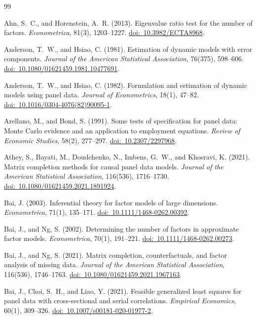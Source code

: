 \documentclass[11pt]{article}
\numberwithin{equation}{section}
\theoremstyle{remark}
\newcommand{\doilink}[1]{\href{https://doi.org/#1}{doi:\ #1}}
\begin{document}
\begin{singlespace}
\begin{thebibliography}{99}

Ahn, S.~C., and Horenstein, A.~R. (2013).
Eigenvalue ratio test for the number of factors.
\emph{Econometrica}, 81(3), 1203--1227.
\doilink{10.3982/ECTA8968}.

Anderson, T.~W., and Hsiao, C. (1981).
Estimation of dynamic models with error components.
\emph{Journal of the American Statistical Association}, 76(375), 598--606.
\doilink{10.1080/01621459.1981.10477691}.

Anderson, T.~W., and Hsiao, C. (1982).
Formulation and estimation of dynamic models using panel data.
\emph{Journal of Econometrics}, 18(1), 47--82.
\doilink{10.1016/0304-4076(82)90095-1}.

Arellano, M., and Bond, S. (1991).
Some tests of specification for panel data: Monte Carlo evidence and an application to employment equations.
\emph{Review of Economic Studies}, 58(2), 277--297.
\doilink{10.2307/2297968}.

Athey, S., Bayati, M., Doudchenko, N., Imbens, G.~W., and Khosravi, K. (2021).
Matrix completion methods for causal panel data models.
\emph{Journal of the American Statistical Association}, 116(536), 1716--1730.
\doilink{10.1080/01621459.2021.1891924}.

Bai, J. (2003).
Inferential theory for factor models of large dimensions.
\emph{Econometrica}, 71(1), 135--171.
\doilink{10.1111/1468-0262.00392}.

Bai, J., and Ng, S. (2002).
Determining the number of factors in approximate factor models.
\emph{Econometrica}, 70(1), 191--221.
\doilink{10.1111/1468-0262.00273}.

Bai, J., and Ng, S. (2021).
Matrix completion, counterfactuals, and factor analysis of missing data.
\emph{Journal of the American Statistical Association}, 116(536), 1746--1763.
\doilink{10.1080/01621459.2021.1967163}.


Bai, J., Choi, S.~H., and Liao, Y. (2021).
Feasible generalized least squares for panel data with cross-sectional and serial correlations.
\emph{Empirical Economics}, 60(1), 309--326.
\doilink{10.1007/s00181-020-01977-2}.


\end{thebibliography}
\end{singlespace}
\end{document}
